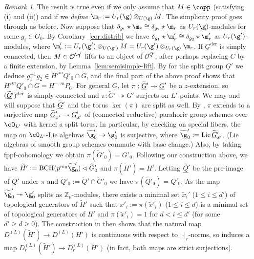\documentclass[a4paper]{amsart}
\numberwithin{equation}{section}
\theoremstyle{remark}
\newtheorem{remark}[thm]{Remark}
\theoremstyle{definition}
\DeclareMathOperator{\Lie}{Lie}
\newcommand{\Z}{\mathbb{Z}}
\DeclareMathOperator{\BCH}{BCH}
\newcommand{\alggrp}[1]{\underline{#1}}
\newcommand{\der}{\mathrm{der}}
\newcommand{\onto}{\twoheadrightarrow}
\newcommand{\lowprime}[1][\prime]{
  \mathchoice
    {\raisebox{-0.7ex}{$\scriptstyle #1$}}
    {\raisebox{-0.7ex}{$\scriptstyle #1$}}
    {\raisebox{-0.7ex}{$\scriptstyle #1$}}
    {\raisebox{-0.3ex}{$\scriptscriptstyle #1$}}
}
\newcommand{\wt}[1]{\widetilde{#1}}
\begin{document}
\begin{remark}\label{rk:OS-4.7}  The result is true even if we only assume that $M \in \copp$ (satisfying (i) and (ii)) and if we \emph{define} $\m_r := U_r(\g)\otimes_{U(\g)} M$. 
  The simplicity proof goes through as before.
  Now suppose that $\delta_{g_1} \star \m_r \cong \delta_{g_2} \star \m_r$ as $U_r(\g)$-modules for some $g_i \in G_0$.
  By Corollary~\ref{cor:distrib} we have $\delta_{g_1} \star \m_r' \cong \delta_{g_2} \star \m_r'$ as $U_r(\g')$-modules, where $\m_r' := U_r(\g') \otimes_{U(\g')} M = U_r(\g') \otimes_{U_r(\g)} \m_r$.
  If $\alggrp G^{\der}$ is simply connected, then $M \in \mathcal O^{\q'}$ lifts to an object of $\mathcal O^{Q'}$, after perhaps replacing $C$ by a finite extension, by Lemma~\ref{lem:semisimple-lift}.
  By \cite[Theorem 4.7]{OS3} for the split group $\alggrp G'$ we deduce $g_1^{-1} g_2 \in H'^{m} Q'_0 \cap G$, and the final part of the above proof shows that $H'^{m} Q'_0 \cap G = H^{-,m} P_0$.
  For general $\alggrp G$, let $\pi : \wt{\alggrp G}^{\lowprime} \onto \alggrp G'$ be a $z$-extension, so $(\wt {\alggrp G}^{\lowprime})^\der$ is simply connected and $\pi : \wt G' \onto G'$ surjects on $L'$-points.
  We may and will suppose that $\wt{\alggrp G}^{\lowprime}$ and the torus $\ker(\pi)$ are split as well.   By \cite[Proposition 1.1.4]{MR3905466}, $\pi$ extends to a surjective map $\wt{\alggrp G}^{\lowprime}_{x'} \onto \alggrp G'_{x'}$ of (connected reductive) parahoric group schemes over $\cO_{L'}$ with kernel a split torus.
  In particular, by checking on special fibers, the map on $\cO_{L'}$-Lie algebras $\wt{\g}'_0 \to \g'_0$ is surjective, where $\wt{\g}'_0 := \Lie \wt{\alggrp G}^{\lowprime}_{x'}$.
  (Lie algebras of smooth group schemes commute with base change.) 
  Also, by taking fppf-cohomology we obtain $\pi(\wt G'_0) = G'_0$.
  Following our construction above, we have $\wt H' := \BCH(p^{m_0} \wt \g'_0) \lhd \wt G'_0$ and $\pi(\wt H') = H'$.
  Letting $\wt{\alggrp Q}^{\lowprime}$ be the pre-image of $\alggrp Q'$ under $\pi$ and $\wt Q'_0 := \wt Q' \cap \wt G'_0$ we have $\pi(\wt Q'_0) = Q'_0$.
  As the map $\wt{\g}'_0 \onto \g'_0$ splits as $\Z_p$-modules, there exists a minimal set $\wt x_i'$ ($1 \le i \le d'$) of topological generators of $\wt H'$ such that $x'_i := \pi(\wt x'_i)$ ($1 \le i \le d$) is a minimal set of topological generators of $H'$ and $\pi(\wt x'_i) = 1$ for $d < i \le d'$ (for some $d' \ge d \ge 0$).
  The construction in \cite[\S2.2.6]{OS} then shows that the natural map $D^{(L)}(\wt H') \to D^{(L)}(H')$ is continuous with respect to $\lvert\cdot\rvert_r$-norms, so induces a map $D^{(L)}_r(\wt H') \to D^{(L)}_r(H')$ (in fact, both maps are strict surjections).

\end{remark}
\end{document}
